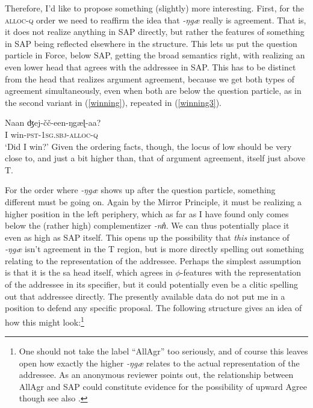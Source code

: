\documentclass[output=paper, modfonts, nonflat]{langsci/langscibook}
\begin{document}
Therefore, I'd like to propose something (slightly) more
interesting. First, for the \textsc{alloc}{}-\textsc{q} order we need to
reaffirm the idea that \textit{-ŋgæ} really is agreement. That is, it
does not realize anything in SAP directly, but rather the features of
something in SAP being reflected elsewhere in the structure. This lets
us put the question particle in Force, below SAP, getting the broad
semantics right, with \allagr{} realizing an even lower head that
agrees with the addressee in SAP. This has to be distinct from the
head that realizes argument agreement, because we get both types of
agreement simultaneously, even when both are below the question
particle, as in the second variant in (\ref{winning}), repeated in
(\ref{winning3}).

\ea\label{winning3}\gll Naan ʤej-\v{c}\v{c}-een-ŋgæɭ-aa?\\
 I win-\textsc{pst}-1\textsc{sg}.\textsc{sbj}-\textsc{alloc}-\textsc{q}\\
 \glt `Did I win?'
\z
%
Given the ordering facts, though, the locus of low \allagr{} should be
very close to, and just a bit higher than, that of argument agreement,
itself just above T.

For the order where \textit{-ŋgæ} shows up after the question
particle, something different must be going on. Again by the Mirror
Principle, it must be realizing a higher position in the left
periphery, which as far as I have found only comes below the (rather
high) complementizer \textit{-nn\U}. We can thus potentially place it
even as high as SAP itself. This opens up the possibility that
\emph{this} instance of \textit{-ŋgæ} isn't agreement in the T
region, but is more directly spelling out something relating to the
representation of the addressee. Perhaps the simplest assumption is
that it is the sa head itself, which agrees in $\phi$-features with
the representation of the addressee in its specifier, but it could
potentially even be a clitic spelling out that addressee directly. The
presently available data do not put me in a position to defend any
specific proposal. The following structure gives an idea of how this
might look:\footnote{One should not take the label ``AllAgr'' too
  seriously, and of course this leaves open how exactly the higher
  \textit{-ŋgæ} relates to the actual representation of the
  addressee. As an anonymous reviewer points out, the relationship
  between AllAgr and SAP could constitute evidence for the possibility
  of upward Agree \citep[e.g.][]{zeijlstra:2012} though see also .}
\end{document}
